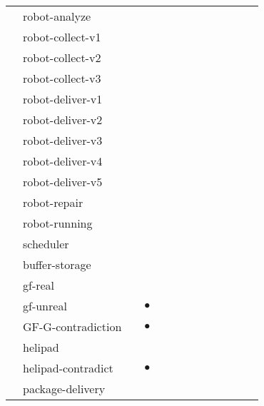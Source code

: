 \begin{tabular}{|c|lr|c||c|c|c||c|c|c|c||c|c|}
&  \textsf{robot-analyze} & \cite{DBLP:conf/cav/SchmuckHDN24} &  &  &  &  &  &  &  &  &  &  \\
&  \textsf{robot-collect-v1} & \cite{DBLP:conf/cav/SchmuckHDN24} &  &  &  &  &  &  &  &  &  &  \\
&  \textsf{robot-collect-v2} & \cite{DBLP:conf/cav/SchmuckHDN24} &  &  &  &  &  &  &  &  &  &  \\
&  \textsf{robot-collect-v3} & \cite{DBLP:conf/cav/SchmuckHDN24} &  &  &  &  &  &  &  &  &  &  \\
&  \textsf{robot-deliver-v1} & \cite{DBLP:conf/cav/SchmuckHDN24} &  &  &  &  &  &  &  &  &  &  \\
&  \textsf{robot-deliver-v2} & \cite{DBLP:conf/cav/SchmuckHDN24} &  &  &  &  &  &  &  &  &  &  \\
&  \textsf{robot-deliver-v3} & \cite{DBLP:conf/cav/SchmuckHDN24} &  &  &  &  &  &  &  &  &  &  \\
&  \textsf{robot-deliver-v4} & \cite{DBLP:conf/cav/SchmuckHDN24} &  &  &  &  &  &  &  &  &  &  \\
&  \textsf{robot-deliver-v5} & \cite{DBLP:conf/cav/SchmuckHDN24} &  &  &  &  &  &  &  &  &  &  \\
&  \textsf{robot-repair} & \cite{DBLP:conf/cav/SchmuckHDN24} &  &  &  &  &  &  &  &  &  &  \\
&  \textsf{robot-running} & \cite{DBLP:conf/cav/SchmuckHDN24} &  &  &  &  &  &  &  &  &  &  \\
&  \textsf{scheduler} & \cite{DBLP:conf/cav/SchmuckHDN24} &  &  &  &  &  &  &  &  &  &  \\
&  \textsf{buffer-storage} & \cite{DBLP:journals/pacmpl/HeimD25} &  &  &  &  &  &  &  &  &  &  \\
&  \textsf{gf-real} & \cite{DBLP:journals/pacmpl/HeimD25} &  &  &  &  &  &  &  &  &  &  \\
&  \textsf{gf-unreal} & \cite{DBLP:journals/pacmpl/HeimD25} & $\bullet$ &  &  &  &  &  &  &  &  &  \\
&  \textsf{GF-G-contradiction} & \cite{DBLP:journals/pacmpl/HeimD25} & $\bullet$ &  &  &  &  &  &  &  &  &  \\
&  \textsf{helipad} & \cite{DBLP:journals/pacmpl/HeimD25} &  &  &  &  &  &  &  &  &  &  \\
&  \textsf{helipad-contradict} & \cite{DBLP:journals/pacmpl/HeimD25} & $\bullet$ &  &  &  &  &  &  &  &  &  \\
&  \textsf{package-delivery} & \cite{DBLP:journals/pacmpl/HeimD25} &  &  &  &  &  &  &  &  &  &  \\

\end{tabular}
